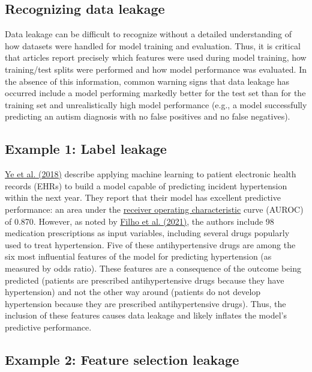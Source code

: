 \documentclass[letterpaper, 12pt]{article}
\begin{document}
\subsection*{Recognizing data leakage}

Data leakage can be difficult to recognize without a detailed understanding of how datasets were handled for model training and evaluation. Thus, it is critical that articles report precisely which features were used during model training, how training/test splits were performed and how model performance was evaluated. In the absence of this information, common warning signs that data leakage has occurred include a model performing markedly better for the test set than for the training set and unrealistically high model performance (e.g., a model successfully predicting  an autism diagnosis with no false positives and no false negatives).

\subsection*{Example 1: Label leakage}

\href{https://doi.org/10.2196/jmir.9268}{Ye et al. (2018)} describe applying machine learning to patient electronic health records (EHRs) to build a model capable of predicting incident hypertension within the next year. They report that their model has excellent predictive performance: an area under the \href{https://en.wikipedia.org/wiki/Receiver_operating_characteristic}{receiver operating characteristic} curve (AUROC) of 0.870. However, as noted by \href{https://doi.org/10.2196/10969}{Filho et al. (2021)}, the authors include 98 medication prescriptions as input variables, including several drugs popularly used to treat hypertension. Five of these antihypertensive drugs are among the six most influential features of the model for predicting hypertension (as measured by odds ratio). These features are a consequence of the outcome being predicted (patients are prescribed antihypertensive drugs because they have hypertension) and not the other way around (patients do not develop hypertension because they are prescribed antihypertensive drugs). Thus, the inclusion of these features causes data leakage and likely inflates the model's predictive performance.

\subsection*{Example 2: Feature selection leakage}
\end{document}
